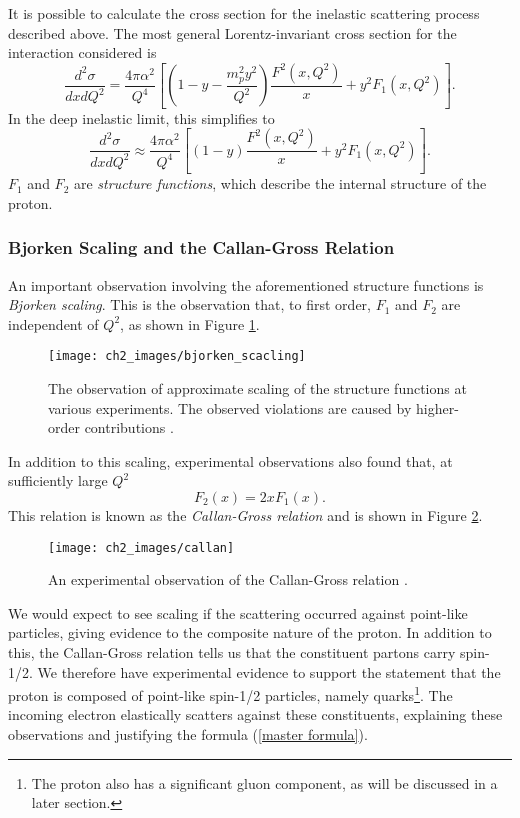 \documentclass[10pt,a4paper]{book}
\begin{document}
It is possible to calculate the cross section for the inelastic scattering process described above. The most general Lorentz-invariant cross section for the interaction considered is
\begin{equation}
\frac{d^2\sigma}{dxdQ^2} = \frac{4\pi\alpha^2}{Q^4}\left[\left(1 - y - \frac{m_p^2 y^2}{Q^2} \right)\frac{F^2(x,Q^2)}{x} + y^2F_1(x,Q^2)\right].
\end{equation}
In the deep inelastic limit, this simplifies to
\begin{equation}
\frac{d^2\sigma}{dxdQ^2} \approx \frac{4\pi\alpha^2}{Q^4}\left[\left( 1 - y \right) \frac{F^2(x,Q^2)}{x} + y^2F_1(x,Q^2)\right]. 
\label{Rutherford}
\end{equation}
$F_1$ and $F_2$ are \emph{structure functions}, which describe the internal structure of the proton.

\subsubsection{Bjorken Scaling and the Callan-Gross Relation}
An important observation involving the aforementioned structure functions is \emph{Bjorken scaling}. This is the observation that, to first order, $F_1$ and $F_2$ are independent of $Q^2$, as shown in Figure \ref{Bjorken scaling}.
\begin{figure}[hp]
\centering
\texttt{[image: ch2\_images/bjorken\_scacling]}
\caption{The observation of approximate scaling of the structure functions at various experiments. The observed violations are caused by higher-order contributions \cite{pdg}.}
\label{Bjorken scaling}
\end{figure}
In addition to this scaling, experimental observations also found that, at sufficiently large $Q^2$
\begin{equation}
F_2(x) = 2xF_1(x).
\end{equation}
This relation is known as the \emph{Callan-Gross relation} and is shown in Figure \ref{Callan gross}.
\begin{figure}[ht]
\centering
\texttt{[image: ch2\_images/callan]}
\caption{An experimental observation of the Callan-Gross relation \cite{Griffiths:2008zz}.}
\label{Callan gross}
\end{figure}
We would expect to see scaling if the scattering occurred against point-like particles, giving evidence to the composite nature of the proton. In addition to this, the Callan-Gross relation tells us that the constituent partons carry spin-1/2. We therefore have experimental evidence to support the statement that the proton is composed of point-like spin-1/2 particles, namely quarks\footnote{The proton also has a significant gluon component, as will be discussed in a later section.}. The incoming electron elastically scatters against these constituents, explaining these observations and justifying the formula (\ref{master formula}).
\end{document}
